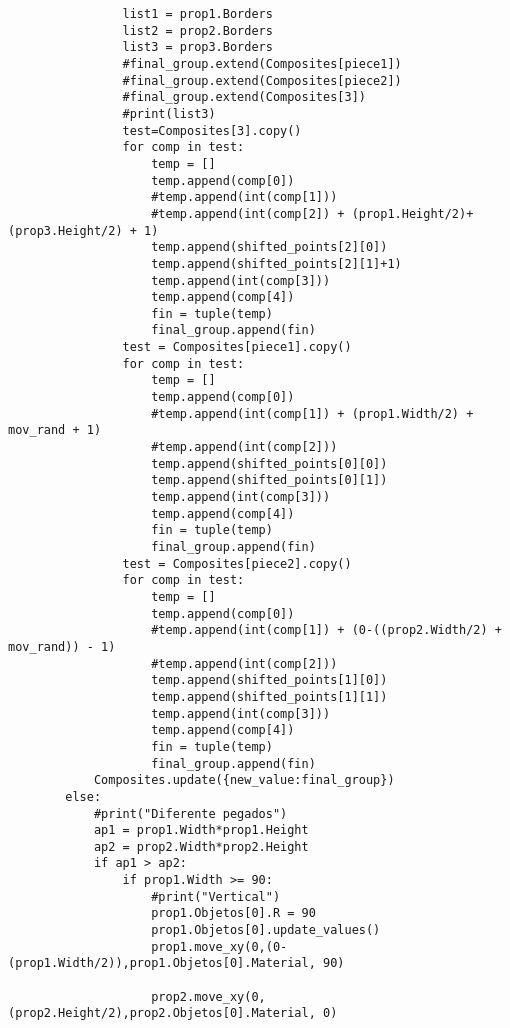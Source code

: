 \begin{verbatim}
                list1 = prop1.Borders
                list2 = prop2.Borders
                list3 = prop3.Borders
                #final_group.extend(Composites[piece1])
                #final_group.extend(Composites[piece2])
                #final_group.extend(Composites[3])
                #print(list3)
                test=Composites[3].copy()
                for comp in test:
                    temp = []
                    temp.append(comp[0])
                    #temp.append(int(comp[1]))
                    #temp.append(int(comp[2]) + (prop1.Height/2)+(prop3.Height/2) + 1)
                    temp.append(shifted_points[2][0])
                    temp.append(shifted_points[2][1]+1)
                    temp.append(int(comp[3]))
                    temp.append(comp[4])
                    fin = tuple(temp)
                    final_group.append(fin)
                test = Composites[piece1].copy()
                for comp in test:
                    temp = []
                    temp.append(comp[0])
                    #temp.append(int(comp[1]) + (prop1.Width/2) + mov_rand + 1)
                    #temp.append(int(comp[2]))
                    temp.append(shifted_points[0][0])
                    temp.append(shifted_points[0][1])
                    temp.append(int(comp[3]))
                    temp.append(comp[4])
                    fin = tuple(temp)
                    final_group.append(fin)
                test = Composites[piece2].copy()
                for comp in test:
                    temp = []
                    temp.append(comp[0])
                    #temp.append(int(comp[1]) + (0-((prop2.Width/2) + mov_rand)) - 1)
                    #temp.append(int(comp[2]))
                    temp.append(shifted_points[1][0])
                    temp.append(shifted_points[1][1])
                    temp.append(int(comp[3]))
                    temp.append(comp[4])
                    fin = tuple(temp)
                    final_group.append(fin)
            Composites.update({new_value:final_group})
        else:
            #print("Diferente pegados")
            ap1 = prop1.Width*prop1.Height
            ap2 = prop2.Width*prop2.Height
            if ap1 > ap2:
                if prop1.Width >= 90:
                    #print("Vertical")
                    prop1.Objetos[0].R = 90
                    prop1.Objetos[0].update_values()
                    prop1.move_xy(0,(0-(prop1.Width/2)),prop1.Objetos[0].Material, 90)

                    prop2.move_xy(0,(prop2.Height/2),prop2.Objetos[0].Material, 0)


\end{verbatim}
